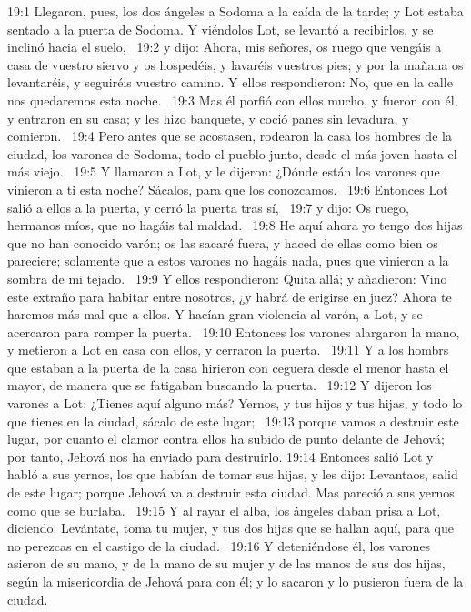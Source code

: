 19:1 Llegaron, pues, los dos ángeles a Sodoma a la caída de la tarde; y Lot estaba sentado a la puerta de Sodoma. Y viéndolos Lot, se levantó a recibirlos, y se inclinó hacia el suelo,  
19:2 y dijo: Ahora, mis señores, os ruego que vengáis a casa de vuestro siervo y os hospedéis, y lavaréis vuestros pies; y por la mañana os levantaréis, y seguiréis vuestro camino. Y ellos respondieron: No, que en la calle nos quedaremos esta noche.  
19:3 Mas él porfió con ellos mucho, y fueron con él, y entraron en su casa; y les hizo banquete, y coció panes sin levadura, y comieron.  
19:4 Pero antes que se acostasen, rodearon la casa los hombres de la ciudad, los varones de Sodoma, todo el pueblo junto, desde el más joven hasta el más viejo.  
19:5 Y llamaron a Lot, y le dijeron: ¿Dónde están los varones que vinieron a ti esta noche? Sácalos, para que los conozcamos.  
19:6 Entonces Lot salió a ellos a la puerta, y cerró la puerta tras sí,  
19:7 y dijo: Os ruego, hermanos míos, que no hagáis tal maldad.  
19:8 He aquí ahora yo tengo dos hijas que no han conocido varón; os las sacaré fuera, y haced de ellas como bien os pareciere; solamente que a estos varones no hagáis nada, pues que vinieron a la sombra de mi tejado.  
19:9 Y ellos respondieron: Quita allá; y añadieron: Vino este extraño para habitar entre nosotros, ¿y habrá de erigirse en juez? Ahora te haremos más mal que a ellos. Y hacían gran violencia al varón, a Lot, y se acercaron para romper la puerta.  
19:10 Entonces los varones alargaron la mano, y metieron a Lot en casa con ellos, y cerraron la puerta.  
19:11 Y a los hombrs que estaban a la puerta de la casa hirieron con ceguera desde el menor hasta el mayor, de manera que se fatigaban buscando la puerta.  
19:12 Y dijeron los varones a Lot: ¿Tienes aquí alguno más? Yernos, y tus hijos y tus hijas, y todo lo que tienes en la ciudad, sácalo de este lugar;  
19:13 porque vamos a destruir este lugar, por cuanto el clamor contra ellos ha subido de punto delante de Jehová; por tanto, Jehová nos ha enviado para destruirlo. 
19:14 Entonces salió Lot y habló a sus yernos, los que habían de tomar sus hijas, y les dijo: Levantaos, salid de este lugar; porque Jehová va a destruir esta ciudad. Mas pareció a sus yernos como que se burlaba.  
19:15 Y al rayar el alba, los ángeles daban prisa a Lot, diciendo: Levántate, toma tu mujer, y tus dos hijas que se hallan aquí, para que no perezcas en el castigo de la ciudad.  
19:16 Y deteniéndose él, los varones asieron de su mano, y de la mano de su mujer y de las manos de sus dos hijas, según la misericordia de Jehová para con él; y lo sacaron y lo pusieron fuera de la ciudad.  
